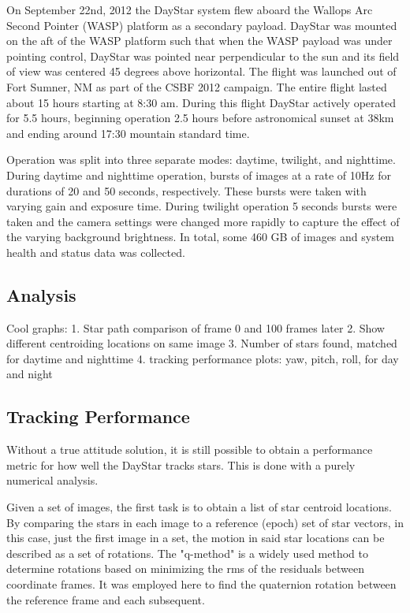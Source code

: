 \documentclass[twocolumn,letterpaper]{IEEEAerospace2012}
\begin{document}
On September 22nd, 2012 the DayStar system flew aboard the Wallops Arc Second Pointer (WASP) platform as a secondary payload. DayStar was mounted on the aft of the WASP platform such that when the WASP payload was under pointing control, DayStar was pointed near perpendicular to the sun and its field of view was centered 45 degrees above horizontal. The flight was launched out of Fort Sumner, NM as part of the CSBF 2012 campaign. The entire flight lasted about 15 hours starting at 8:30 am. During this flight DayStar actively operated for 5.5 hours, beginning operation 2.5 hours before astronomical sunset at 38km and ending around 17:30 mountain standard time.

Operation was split into three separate modes: daytime, twilight, and nighttime. During daytime and nighttime operation, bursts of images at a rate of 10Hz for durations of 20 and 50 seconds, respectively. These bursts were taken with varying gain and exposure time. During twilight operation 5 seconds bursts were taken and the camera settings were changed more rapidly to capture the effect of the varying background brightness. In total, some 460 GB of images and system health and status data was collected.

\subsection{Analysis}
Cool graphs:
1. Star path comparison of frame 0 and 100 frames later
2. Show different centroiding locations on same image
3. Number of stars found, matched for daytime and nighttime
4. tracking performance plots: yaw, pitch, roll, for day and night

\subsection{Tracking Performance}
Without a true attitude solution, it is still possible to obtain a performance metric for how well the DayStar tracks stars. This is done with a purely numerical analysis.

Given a set of images, the first task is to obtain a list of star centroid locations. By comparing the stars in each image to a reference (epoch) set of star vectors, in this case, just the first image in a set, the motion in said star locations can be described as a set of rotations. The "q-method" is a widely used method to determine rotations based on minimizing the rms of the residuals between coordinate frames. It was employed here to find the quaternion rotation between the reference frame and each subsequent.
\end{document}

